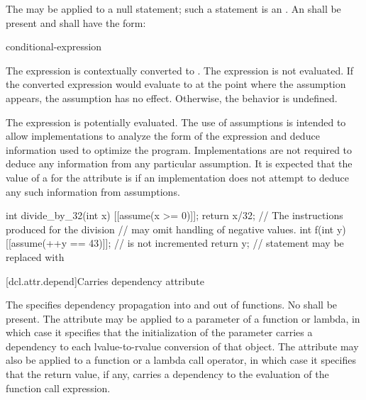 The   may be applied to a null statement;
such a statement is an .
An  shall be present and
shall have the form:
\begin{ncsimplebnf}
\terminal{(} conditional-expression \terminal{)}
\end{ncsimplebnf}
The expression is contextually converted to .
The expression is not evaluated.
If the converted expression would evaluate to 
at the point where the assumption appears,
the assumption has no effect.
Otherwise, the behavior is undefined.
\begin{note}
The expression is potentially evaluated.
The use of assumptions is intended to allow implementations
to analyze the form of the expression and
deduce information used to optimize the program.
Implementations are not required to deduce
any information from any particular assumption.
It is expected that the value of
a  for the  attribute
is 
if an implementation does not attempt to deduce
any such information from assumptions.
\end{note}
\begin{example}
\begin{codeblock}
int divide_by_32(int x) {
  [[assume(x >= 0)]];
  return x/32;                  // The instructions produced for the division
                                // may omit handling of negative values.
}
int f(int y) {
  [[assume(++y == 43)]];        //  is not incremented
  return y;                     // statement may be replaced with 
}
\end{codeblock}
\end{example}

[dcl.attr.depend]{Carries dependency attribute}%

\pnum
The   specifies
dependency propagation into and out of functions.
No
 shall be present. The attribute may be
applied to a parameter of a function or lambda, in
which case it specifies that the initialization of the parameter carries a
dependency to each lvalue-to-rvalue
conversion of that object. The attribute may also be applied
to a function or a lambda call operator, in which case it
specifies that the return value, if any, carries a dependency to the evaluation
of the function call expression.

